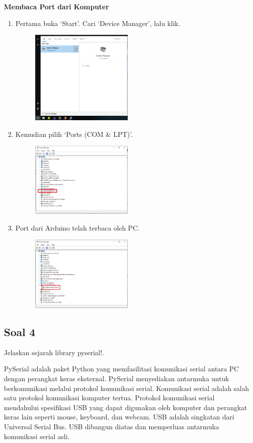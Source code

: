\textbf{Membaca Port dari Komputer}
\begin{enumerate}
	\item Pertama buka `Start'. Cari `Device Manager', lalu klik.
	\begin{figure}[H]
		\includegraphics[width=5cm]{figures/5/1154016/Teori/d1.png}
		\centering
	\end{figure}
	\item Kemudian pilih `Ports (COM \& LPT)'.
	\begin{figure}[H]
		\includegraphics[width=5cm]{figures/5/1154016/Teori/d3.png}
		\centering
	\end{figure}
	\item Port dari Arduino telah terbaca oleh PC.
	\begin{figure}[H]
		\includegraphics[width=5cm]{figures/5/1154016/Teori/d2.png}
		\centering
	\end{figure}
\end{enumerate}



\subsection{Soal 4}
Jelaskan sejarah library pyserial!.

\hfill \break
PySerial adalah paket Python yang memfasilitasi komunikasi serial antara PC dengan perangkat keras eksternal. PySerial menyediakan antarmuka untuk berkomunikasi melalui protokol komunikasi serial. Komunikasi serial adalah salah satu protokol komunikasi komputer tertua. Protokol komunikasi serial mendahului spesifikasi USB yang dapat digunakan oleh komputer dan perangkat keras lain seperti mouse, keyboard, dan webcam. USB adalah singkatan dari Universal Serial Bus. USB dibangun diatas dan memperluas antarmuka komunikasi serial asli.

